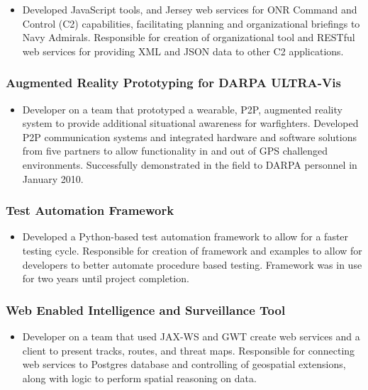\documentclass[11pt]{article}
\begin{document}
\begin{itemize}
\item Developed JavaScript tools, and Jersey web services for ONR Command and Control (C2) capabilities, facilitating planning and organizational briefings to Navy Admirals. Responsible for creation of organizational tool and RESTful web services for providing XML and JSON data to other C2 applications.
\end{itemize}
\subsubsection*{Augmented Reality Prototyping for DARPA ULTRA-Vis}
\label{sec-1.1.4}

\begin{itemize}
\item Developer on a team that prototyped a wearable, P2P, augmented reality system to provide additional situational awareness for warfighters. Developed P2P communication systems and integrated hardware and software solutions from five partners to allow functionality in and out of GPS challenged environments. Successfully demonstrated in the field to DARPA personnel in January 2010.
\end{itemize}
\subsubsection*{Test Automation Framework}
\label{sec-1.1.5}

\begin{itemize}
\item Developed a Python-based test automation framework to allow for a faster testing cycle. Responsible for creation of framework and examples to allow for developers to better automate procedure based testing. Framework was in use for two years until project completion.
\end{itemize}
\subsubsection*{Web Enabled Intelligence and Surveillance Tool}
\label{sec-1.1.6}

\begin{itemize}
\item Developer on a team that used JAX-WS and GWT create web services and a client to present tracks, routes, and threat maps. Responsible for connecting web services to Postgres database and controlling of geospatial extensions, along with logic to perform spatial reasoning on data.
\end{itemize}
\end{document}
